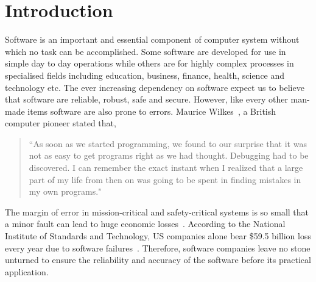 \chapter{Introduction}

Software is an important and essential component of computer system without which no task can be accomplished. Some software are developed for use in simple day to day operations while others are for highly complex processes in specialised fields including education, business, finance, health, science and technology etc. The ever increasing dependency on software expect us to believe that software are reliable, robust, safe and secure. However, like every other man-made items software are also prone to errors. Maurice Wilkes~\cite{wilkes1985memoirs}, a British computer pioneer stated that,
\begin{quote}
``As soon as we started programming, we found to our surprise that it was not as easy to get programs right as we had thought. Debugging had to be discovered. I can remember the exact instant when I realized that a large part of my life from then on was going to be spent in finding mistakes in my own programs."
\end{quote}
The margin of error in mission-critical and safety-critical systems is so small that a minor fault can lead to huge economic losses~\cite{huang2004securing}. According to the National Institute of Standards and Technology, US companies alone bear \$59.5 billion loss every year due to software failures~\cite{tassey2002economic}. Therefore, software companies leave no stone unturned to ensure the reliability and accuracy of the software before its practical application. 

